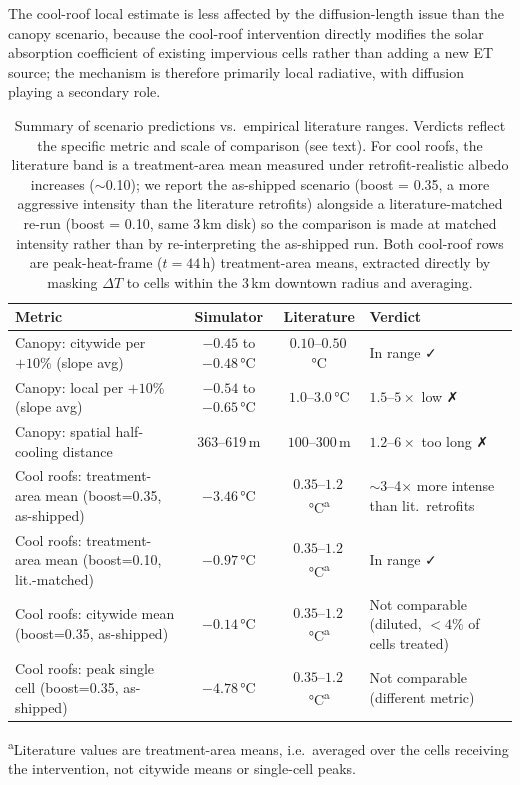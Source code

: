 \documentclass[12pt, letterpaper]{article}
\begin{document}
The cool-roof local estimate is less affected by the diffusion-length issue
than the canopy scenario, because the cool-roof intervention directly
modifies the solar absorption coefficient of existing impervious cells
rather than adding a new ET source; the mechanism is therefore primarily
local radiative, with diffusion playing a secondary role.

\begin{table}[ht]
  \centering
  \caption{Summary of scenario predictions vs.\ empirical literature ranges.
  Verdicts reflect the specific metric and scale of comparison (see text).
  For cool roofs, the literature band is a treatment-area mean measured
  under retrofit-realistic albedo increases ($\sim$0.10); we report the
  as-shipped scenario (boost = 0.35, a more aggressive intensity than the
  literature retrofits) alongside a literature-matched re-run (boost = 0.10,
  same 3\,km disk) so the comparison is made at matched intensity rather
  than by re-interpreting the as-shipped run. Both cool-roof rows are
  peak-heat-frame ($t=44$\,h) treatment-area means, extracted directly by
  masking $\Delta T$ to cells within the 3\,km downtown radius and
  averaging.}
  \label{tab:lit_comparison}
  \begin{tabular}{lccl}
    \toprule
    Metric & Simulator & Literature & Verdict \\
    \midrule
    Canopy: citywide per $+10\%$ (slope avg) &
      $-0.45$ to $-0.48$\,°C & $0.10$--$0.50$\,°C & In range ✓ \\
    Canopy: local per $+10\%$ (slope avg) &
      $-0.54$ to $-0.65$\,°C & $1.0$--$3.0$\,°C & $1.5$--$5\times$ low ✗ \\
    Canopy: spatial half-cooling distance &
      363--619\,m & $100$--$300$\,m & $1.2$--$6\times$ too long ✗ \\
    Cool roofs: treatment-area mean (boost=0.35, as-shipped) &
      $-3.46$\,°C & $0.35$--$1.2$\,°C\textsuperscript{a} & $\sim$3--4$\times$ more intense than lit.\ retrofits \\
    Cool roofs: treatment-area mean (boost=0.10, lit.-matched) &
      $-0.97$\,°C & $0.35$--$1.2$\,°C\textsuperscript{a} & In range ✓ \\
    Cool roofs: citywide mean (boost=0.35, as-shipped) &
      $-0.14$\,°C & $0.35$--$1.2$\,°C\textsuperscript{a} & Not comparable (diluted, $<4\%$ of cells treated) \\
    Cool roofs: peak single cell (boost=0.35, as-shipped) &
      $-4.78$\,°C & $0.35$--$1.2$\,°C\textsuperscript{a} & Not comparable (different metric) \\
    \bottomrule
  \end{tabular}
  \vspace{0.3em}
  \small\textsuperscript{a}Literature values are treatment-area means, i.e.\
  averaged over the cells receiving the intervention, not citywide means or
  single-cell peaks.
\end{table}
\end{document}
